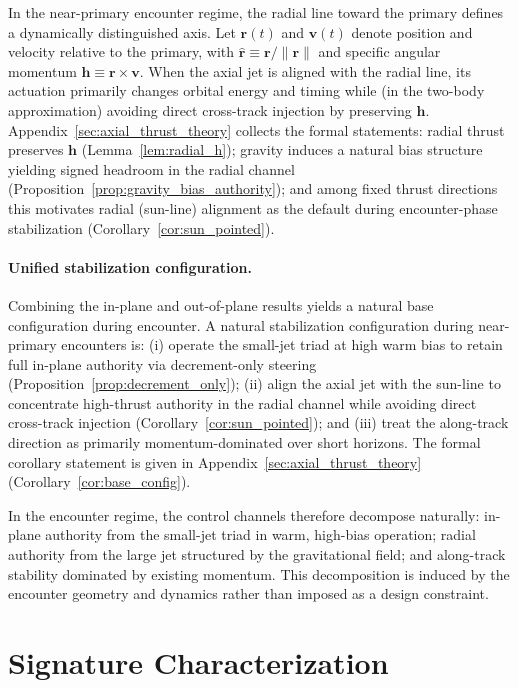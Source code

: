 \documentclass{article}
\begin{document}
In the near-primary encounter regime, the radial line toward the primary defines a dynamically distinguished axis. Let $\mathbf r(t)$ and $\mathbf v(t)$ denote position and velocity relative to the primary, with $\hat{\mathbf r}\equiv \mathbf r/\|\mathbf r\|$ and specific angular momentum $\mathbf h\equiv \mathbf r\times \mathbf v$. When the axial jet is aligned with the radial line, its actuation primarily changes orbital energy and timing while (in the two-body approximation) avoiding direct cross-track injection by preserving $\mathbf h$. Appendix~\ref{sec:axial_thrust_theory} collects the formal statements: radial thrust preserves $\mathbf h$ (Lemma~\ref{lem:radial_h}); gravity induces a natural bias structure yielding signed headroom in the radial channel (Proposition~\ref{prop:gravity_bias_authority}); and among fixed thrust directions this motivates radial (sun-line) alignment as the default during encounter-phase stabilization (Corollary~\ref{cor:sun_pointed}).



\paragraph{Unified stabilization configuration.}

Combining the in-plane and out-of-plane results yields a natural base configuration during encounter. A natural stabilization configuration during near-primary encounters is:
(i) operate the small-jet triad at high warm bias to retain full in-plane authority via decrement-only steering (Proposition~\ref{prop:decrement_only});
(ii) align the axial jet with the sun-line to concentrate high-thrust authority in the radial channel while avoiding direct cross-track injection (Corollary~\ref{cor:sun_pointed});
and (iii) treat the along-track direction as primarily momentum-dominated over short horizons.
The formal corollary statement is given in Appendix~\ref{sec:axial_thrust_theory} (Corollary~\ref{cor:base_config}).

In the encounter regime, the control channels therefore decompose naturally: in-plane authority from the small-jet triad in warm, high-bias operation; radial authority from the large jet structured by the gravitational field; and along-track stability dominated by existing momentum. This decomposition is induced by the encounter geometry and dynamics rather than imposed as a design constraint.

\section{Signature Characterization}
\label{sec:signatures}
\end{document}
